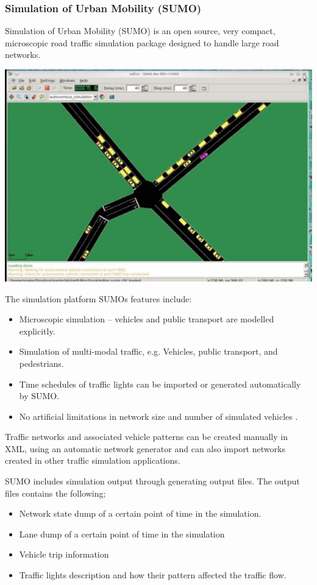 \subsubsection{Simulation of Urban Mobility (SUMO)}
	Simulation of Urban Mobility (SUMO) is an open source, very compact, microscopic road traffic simulation package designed to handle large road networks\cite{EM1}.
	\begin{center}
	\includegraphics[scale=0.3]{./images/SUMO.png}
	\end{center}
	The simulation platform SUMOs features include:
	\begin{itemize}
		\item Microscopic simulation – vehicles and public transport are modelled explicitly.
		\item Simulation of multi-modal traffic, e.g. Vehicles, public transport, and pedestrians.
		\item Time schedules of traffic lights can be imported or generated automatically by SUMO.
		\item No artificial limitations in network size and number of simulated vehicles \cite{EM1}.
	\end{itemize}

	Traffic networks and associated vehicle patterns can be created manually in XML, using an automatic network generator and can also import networks created in other traffic simulation applications.
	
	SUMO includes simulation output through generating output files. The output files contains the following;
	
	\begin{itemize}
		\item Network state dump of a certain point of time in the simulation.
		\item Lane dump of a certain point of time in the simulation
		\item Vehicle trip information
		\item Traffic lights description and how their pattern affected the traffic flow.
	\end{itemize}
	
